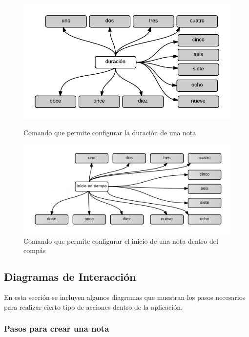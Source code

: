\begin{figure}[H]
\begin{minipage}[b]{0.5\linewidth}
\centering
\includegraphics[width=0.9\linewidth]{./graphics/cmd-dur.png}
\caption{Comando que permite configurar la duraci\'on de una nota}
\label{figure:cmd-dur-anexo}
\end{minipage}
\quad
\begin{minipage}[b]{0.5\linewidth}
\centering
\includegraphics[width=1.1\linewidth]{./graphics/cmd-note-tiempo.png}
\caption{Comando que permite configurar el inicio de una nota dentro del comp\'as}
\label{figure:cmd-note-tiempo-anexo}
\end{minipage}
\end{figure}

\subsection{Diagramas de Interacci\'on}

En esta secci\'on se incluyen algunos diagramas que muestran los pasos necesarios para realizar cierto 
tipo de acciones dentro de la aplicaci\'on.

\subsubsection{Pasos para crear una nota}


